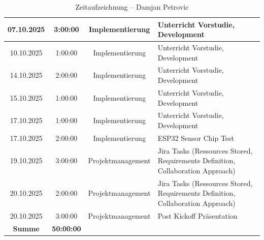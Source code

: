 \documentclass{article}
\begin{document}
\begin{table}[H]
\begin{tabularx}{\textwidth}{|c|c|c|X|}
    07.10.2025 & 3:00:00 & Implementierung   & Unterricht Vorstudie, Development \\ \hline
    10.10.2025 & 1:00:00 & Implementierung   & Unterricht Vorstudie, Development \\ \hline
    14.10.2025 & 2:00:00 & Implementierung   & Unterricht Vorstudie, Development \\ \hline
    15.10.2025 & 1:00:00 & Implementierung   & Unterricht Vorstudie, Development \\ \hline
    17.10.2025 & 1:00:00 & Implementierung   & Unterricht Vorstudie, Development \\ \hline
    17.10.2025 & 2:00:00 & Implementierung   & ESP32 Sensor Chip Test \\ \hline
    19.10.2025 & 3:00:00 & Projektmanagement & Jira Tasks (Ressources Stored, Requirements Definition, Collaboration Approach) \\ \hline
    20.10.2025 & 2:00:00 & Projektmanagement & Jira Tasks (Ressources Stored, Requirements Definition, Collaboration Approach) \\ \hline
    20.10.2025 & 3:00:00 & Projektmanagement & Post Kickoff Präsentation \\ \hline
    \rowcolor{black!10}\textbf{Summe} & \textbf{50:00:00} & & \\ \hline
  \end{tabularx}
  \caption{Zeitaufzeichnung – Damjan Petrovic}
  \label{tab:zeit-damjan}
\end{table}
\end{document}

